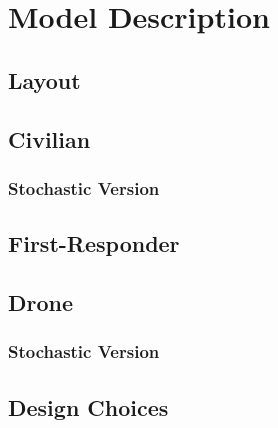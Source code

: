 
\section{Model Description}

\subsection{Layout}

\subsection{Civilian}

\subsubsection{Stochastic Version}

\subsection{First-Responder}

\subsection{Drone}

\subsubsection{Stochastic Version}

\subsection{Design Choices}
